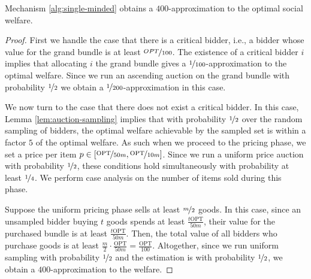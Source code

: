 \begin{lemma}\label{lem:single-minded-approx}
Mechanism \ref{alg:single-minded} obtains 
a $400$-approximation
to the optimal social welfare.
\end{lemma}
\begin{proof}
First we handle the case that there is a critical bidder, i.e., 
a bidder whose value for the grand bundle is at least $\nicefrac{OPT}{100}$. 
The existence of a critical bidder $i$ implies that allocating $i$ the grand bundle gives a $\nicefrac{1}{100}$-approximation to the optimal welfare.  Since we run an ascending auction on the grand bundle with probability $\nicefrac{1}{2}$ we obtain a $\nicefrac{1}{200}$-approximation  
in this case.


We now turn to the case that there does not exist a critical bidder.
In this case, Lemma \ref{lem:auction-sampling} implies that with probability $\nicefrac{1}{2}$ over the random sampling of bidders,
the optimal welfare achievable by the sampled set is within a factor $5$ of the optimal welfare.
As such when we proceed to the pricing phase, we set a price per item $p \in [\nicefrac{\text{OPT}}{50m}, \nicefrac{\text{OPT}}{10m}]$. Since we run a uniform price auction with probability $\nicefrac{1}{2}$, these conditions hold simultaneously with probability at least $\nicefrac{1}{4}$.
We perform case analysis on the number of items sold during this phase. 

Suppose the uniform pricing phase sells at least $\nicefrac{m}{2}$ goods.  In this case, since an unsampled bidder buying $t$ goods spends at least $\frac{t\text{OPT}}{50m}$, their value for the purchased bundle is at least $\frac{t\text{OPT}}{50m}$.  
Then, the total value of all bidders who purchase goods is at least $\frac{m}{2}\cdot\frac{\text{OPT}}{50m} = \frac{\text{OPT}}{100}$. Altogether, since we run uniform sampling with probability $\nicefrac{1}{2}$ and the estimation is
 with probability $\nicefrac{1}{2}$, we obtain  a $400$-approximation to the welfare.


\end{proof}
